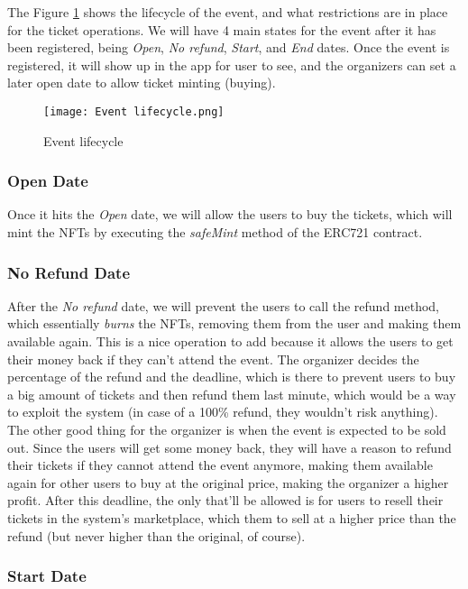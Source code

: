 The Figure \ref{fig:event_lifecycle} shows the lifecycle of the event, and what
restrictions are in place for the ticket operations. We will have 4 main states
for the event after it has been registered, being \textit{Open}, \textit{No
	refund}, \textit{Start}, and \textit{End} dates. Once the event is registered,
it will show up in the app for user to see, and the organizers can set a later
open date to allow ticket minting (buying).

\begin{figure}[H]
	\texttt{[image: Event lifecycle.png]}
	\centering
	\caption{Event lifecycle}
	\label{fig:event_lifecycle}
\end{figure}

\subsubsection{Open Date}

Once it hits the \textit{Open} date, we will allow the users to buy the
tickets, which will mint the NFTs by executing the \textit{safeMint} method of
the ERC721 contract.

\subsubsection{No Refund Date}

After the \textit{No refund} date, we will prevent the users to call the refund
method, which essentially \textit{burns} the NFTs, removing them from the user
and making them available again. This is a nice operation to add because it
allows the users to get their money back if they can't attend the event. The
organizer decides the percentage of the refund and the deadline, which is there
to prevent users to buy a big amount of tickets and then refund them last
minute, which would be a way to exploit the system (in case of a 100\% refund,
they wouldn't risk anything). The other good thing for the organizer is when
the event is expected to be sold out. Since the users will get some money back,
they will have a reason to refund their tickets if they cannot attend the event
anymore, making them available again for other users to buy at the original
price, making the organizer a higher profit. After this deadline, the only
that'll be allowed is for users to resell their tickets in the system's
marketplace, which them to sell at a higher price than the refund (but never
higher than the original, of course).

\subsubsection{Start Date}

